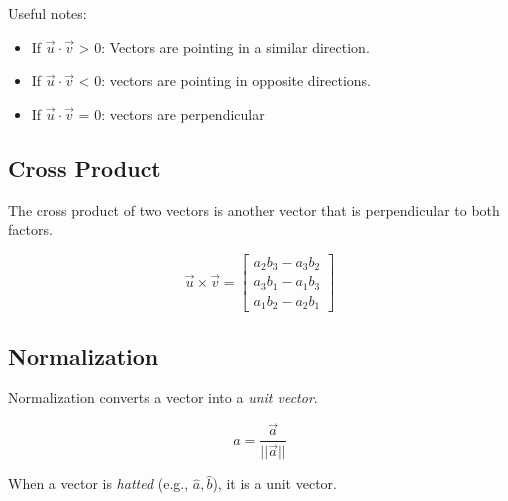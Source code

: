 \documentclass[12pt]{report}
\begin{document}
            Useful notes:

            \begin{itemize}
                \item If $\vec{u} \cdot \vec{v}$ 
                    > 0: Vectors are pointing in a similar direction.
                \item If $\vec{u} \cdot \vec{v}$ 
                    < 0: vectors are pointing in opposite directions.
                \item If $\vec{u} \cdot \vec{v}$ 
                    = 0: vectors are perpendicular
            \end{itemize}

        \subsection{Cross Product}
            The cross product of two vectors is another vector that is perpendicular to both factors.

            \begin{equation}
                \vec{u} \times \vec{v} = \begin{bmatrix} a_2b_3 - a_3b_2 \\ a_3b_1 - a_1b_3 \\ a_1b_2 - a_2b_1 \end{bmatrix}
            \end{equation}

        \subsection{Normalization}
            Normalization converts a vector into a \emph{unit vector}.

            \begin{equation}
                \hat{a} = \frac{\vec{a}}{||\vec{a}||}
            \end{equation}

            When a vector is \emph{hatted} (e.g., $\hat{a}, \hat{b}$), it is a unit vector.
\end{document}
